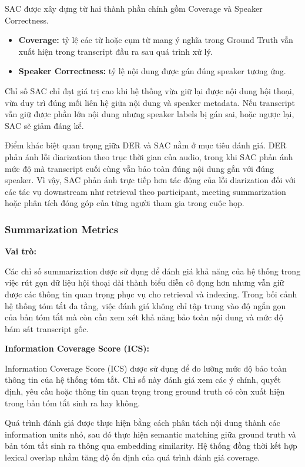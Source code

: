 SAC được xây dựng từ hai thành phần chính gồm Coverage và Speaker Correctness.

\begin{itemize}
    \item \textbf{Coverage:} tỷ lệ các từ hoặc cụm từ mang ý nghĩa trong Ground Truth vẫn xuất hiện trong transcript đầu ra sau quá trình xử lý.
    
    \item \textbf{Speaker Correctness:} tỷ lệ nội dung được gán đúng speaker tương ứng.
\end{itemize}

Chỉ số SAC chỉ đạt giá trị cao khi hệ thống vừa giữ lại được nội dung hội thoại, vừa duy trì đúng mối liên hệ giữa nội dung và speaker metadata. Nếu transcript vẫn giữ được phần lớn nội dung nhưng speaker labels bị gán sai, hoặc ngược lại, SAC sẽ giảm đáng kể.

Điểm khác biệt quan trọng giữa DER và SAC nằm ở mục tiêu đánh giá. DER phản ánh lỗi diarization theo trục thời gian của audio, trong khi SAC phản ánh mức độ mà transcript cuối cùng vẫn bảo toàn đúng nội dung gắn với đúng speaker. Vì vậy, SAC phản ánh trực tiếp hơn tác động của lỗi diarization đối với các tác vụ downstream như retrieval theo participant, meeting summarization hoặc phân tích đóng góp của từng người tham gia trong cuộc họp.

\subsubsection{Summarization Metrics}

\textbf{Vai trò:}

Các chỉ số summarization được sử dụng để đánh giá khả năng của hệ thống trong việc rút gọn dữ liệu hội thoại dài thành biểu diễn cô đọng hơn nhưng vẫn giữ được các thông tin quan trọng phục vụ cho retrieval và indexing. Trong bối cảnh hệ thống tóm tắt đa tầng, việc đánh giá không chỉ tập trung vào độ ngắn gọn của bản tóm tắt mà còn cần xem xét khả năng bảo toàn nội dung và mức độ bám sát transcript gốc.

\textbf{Information Coverage Score (ICS):}

Information Coverage Score (ICS) được sử dụng để đo lường mức độ bảo toàn thông tin của hệ thống tóm tắt. Chỉ số này đánh giá xem các ý chính, quyết định, yêu cầu hoặc thông tin quan trọng trong ground truth có còn xuất hiện trong bản tóm tắt sinh ra hay không.

Quá trình đánh giá được thực hiện bằng cách phân tách nội dung thành các information units nhỏ, sau đó thực hiện semantic matching giữa ground truth và bản tóm tắt sinh ra thông qua embedding similarity. Hệ thống đồng thời kết hợp lexical overlap nhằm tăng độ ổn định của quá trình đánh giá coverage.

